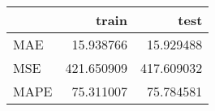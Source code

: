 \begin{tabular}{lrr}
\toprule
{} &       train &        test \\
\midrule
MAE  &   15.938766 &   15.929488 \\
MSE  &  421.650909 &  417.609032 \\
MAPE &   75.311007 &   75.784581 \\
\bottomrule
\end{tabular}
